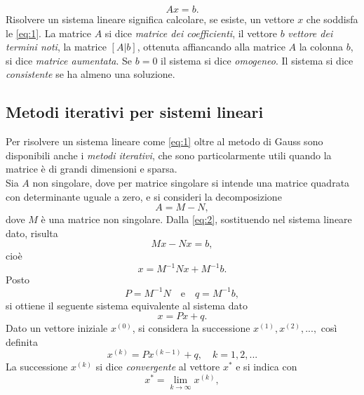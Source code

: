 \documentclass[12pt]{article}
\begin{document}
\begin{equation*}
    Ax = b.
\end{equation*}
Risolvere un sistema lineare significa calcolare, se esiste, un vettore \(x\) che soddisfa le \eqref{eq:1}. La matrice \(A\) si dice \textit{matrice dei coefficienti}, il vettore \(b\) \textit{vettore dei termini noti}, la matrice \([A|b]\), ottenuta affiancando alla matrice \(A\) la colonna \(b\), si dice \textit{matrice aumentata}. Se \(b=0\) il sistema si dice \textit{omogeneo}. Il sistema si dice \textit{consistente} se ha almeno una soluzione.
\subsection{Metodi iterativi per sistemi lineari}
Per risolvere un sistema lineare come \eqref{eq:1} oltre al metodo di Gauss sono disponibili anche i \textit{metodi iterativi}, che sono particolarmente utili quando la matrice è di grandi dimensioni e sparsa.\\
Sia \(A\) non singolare, dove per matrice singolare si intende una matrice quadrata  con determinante uguale a zero, e si consideri la decomposizione
\begin{equation}
    \label{eq:2}
    A = M - N,
\end{equation}
dove \(M\) è una matrice non singolare. Dalla \eqref{eq:2}, sostituendo nel sistema lineare dato, risulta
\begin{equation*}
    Mx - Nx = b,
\end{equation*}
cioè
\begin{equation*}
    x = M^{-1}Nx + M^{-1}b.
\end{equation*}
Posto
\begin{equation}
    \label{eq:3}
    P = M^{-1}N \quad \text{e} \quad q = M^{-1}b,
\end{equation}
si ottiene il seguente sistema equivalente al sistema dato
\begin{equation}
    \label{eq:4}
    x = Px + q.
\end{equation}
Dato un vettore iniziale \(x^{(0)}\), si considera la successione \(x^{(1)},x^{(2)},...,\) così definita
\begin{equation}
    \label{eq:5}
    x^{(k)}=Px^{(k-1)}+q, \quad k=1,2,...
\end{equation}
La successione \(x^{(k)}\) si dice \textit{convergente} al vettore \(x^*\) e si indica con
\begin{equation*}
    x^*=\lim_{k\to\infty} x^{(k)}, 
\end{equation*}
\end{document}
